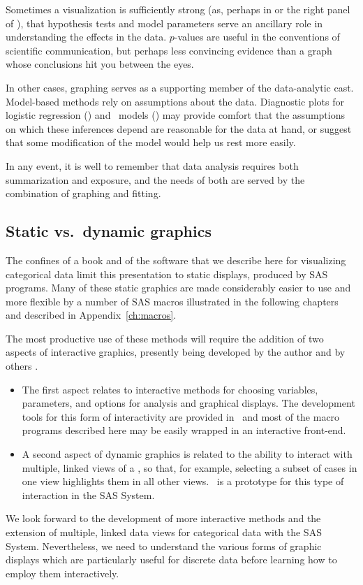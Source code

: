 Sometimes a visualization is sufficiently strong (as, perhaps in
 or the right panel of ),
that hypothesis tests and model parameters
serve an ancillary role in understanding the effects in the data. 
$p$-values are useful in the conventions of scientific communication,
but perhaps less convincing evidence than a graph whose conclusions hit you
between the eyes.

In other cases, graphing serves as a supporting member of the data-analytic
cast.  Model-based methods rely on assumptions about the data.
Diagnostic plots for logistic regression ()
and \loglin\ models ()
may provide comfort that the assumptions on which these inferences
depend are reasonable for the data at hand, or suggest that some modification
of the model would help us rest more easily.

In any event, it is well to remember that data analysis requires both
summarization and exposure, and the needs of both are served by the
combination of graphing and fitting.

\subsection{Static vs.\ dynamic graphics}
The confines of a book and of the software that we describe here for
visualizing categorical data limit this presentation to static displays,
produced by SAS programs.  Many of these static graphics are made
considerably easier to use and more flexible by a number of SAS macros
illustrated in the following chapters and described in Appendix~\ref{ch:macros}.

The most productive use of these methods will require the addition of
two aspects of interactive graphics, presently being developed
by the author \citep{Friendly:96}
and by others \citep{TheusLauer:99,Young:94}.
\begin{itemize}
\item The first aspect relates to interactive methods for choosing variables,
parameters, and options for analysis and graphical displays.  The 
development tools for this form of interactivity are provided in \AF\
and most of the macro programs described here may be easily wrapped
in an interactive front-end.

\item A second aspect of dynamic graphics is related to the ability to interact
with multiple, linked  views of a \Dset, so that, for example,
selecting a subset of cases in one view highlights them in all other
views.  \INSIGHT\
is a prototype for this type of interaction in the SAS System.

\end{itemize}

We look forward to the development of more interactive methods and the
extension of multiple, linked data views for
categorical data with the SAS System.  Nevertheless, we need to understand
the various forms of graphic displays which are particularly useful
for discrete data before learning how to
employ them interactively.
\ix{graphics!static vs.\ dynamic|)}
